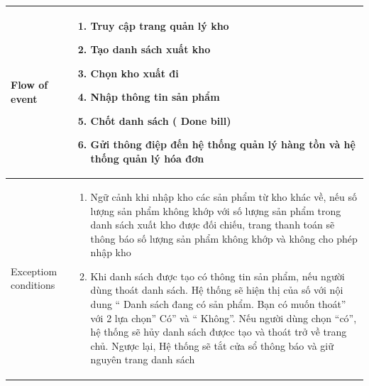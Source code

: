 \documentclass{article}
\begin{document}
    \begin{tabular}{|m{4cm}|m{12cm}|}
    \hline
		Flow of event & \begin{enumerate}
		    \item	Truy cập trang quản lý kho
        	\item Tạo danh sách xuất kho
            \item Chọn kho xuất đi 
            \item Nhập thông tin sản phẩm
            \item Chốt danh sách ( Done bill)
	       \item Gửi thông điệp đến hệ thống quản lý hàng tồn và hệ thống quản lý hóa đơn
	    \end{enumerate}  \\
	
		\hline
		Exceptiom conditions &	\begin{enumerate}
                \item Ngữ cảnh khi nhập kho các sản phẩm từ kho khác về, nếu số lượng sản phẩm không khớp với số lượng sản phẩm trong danh sách xuất kho được đối chiếu, trang thanh toán sẽ thông báo số lượng sản phẩm không khớp và không cho phép nhập kho 
                \item Khi danh sách được tạo có thông tin sản phẩm, nếu người dùng thoát danh sách. Hệ thống sẽ hiện thị của số với nội dung “ Danh sách đang có sản phẩm. Bạn có muốn thoát” với 2 lựa chọn” Có” và “ Không”. Nếu người dùng chọn  “có”, hệ thống sẽ hủy danh sách đượcc tạo và thoát trở về trang chủ. Ngược lại, Hệ thống sẽ tắt cửa sổ thông báo và giữ nguyên trang danh sách
        \end{enumerate}\\
		\hline
\end{tabular}
\end{document}
